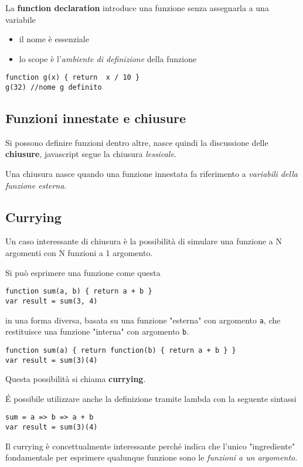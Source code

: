 La \textbf{function declaration} introduce una funzione senza assegnarla a una variabile
\begin{itemize}
    \item il nome è essenziale
    \item lo scope è l'\textit{ambiente di definizione} della funzione
\end{itemize}
\begin{verbatim}
function g(x) { return  x / 10 }
g(32) //nome g definito
\end{verbatim}

\subsection{Funzioni innestate e chiusure}
Si possono definire funzioni dentro altre, nasce quindi la discussione delle \textbf{chiusure}, javascript segue la chiusura \textit{lessicale}.

Una chiusura nasce quando una funzione innestata fa riferimento a \textit{variabili della funzione esterna}.

\subsection{Currying}
Un caso interessante di chiusura è la possibilità di simulare una funzione a N argomenti con N funzioni a 1 argomento.

Si può esprimere una funzione come questa
\begin{verbatim}
function sum(a, b) { return a + b }
var result = sum(3, 4)
\end{verbatim}
in una forma diversa, basata su una funzione "esterna" con argomento \texttt{a}, che restituisce una funzione "interna" con argomento \texttt{b}.
\begin{verbatim}
function sum(a) { return function(b) { return a + b } }
var result = sum(3)(4)
\end{verbatim}

Questa possibilità si chiama \textbf{currying}.

É possibile utilizzare anche la definizione tramite lambda con la seguente sintassi
\begin{verbatim}
sum = a => b => a + b
var result = sum(3)(4)
\end{verbatim}
Il currying è concettualmente interessante perché indica che l'unico "ingrediente" fondamentale per esprimere qualunque funzione sono le \textit{funzioni a un argomento}.

